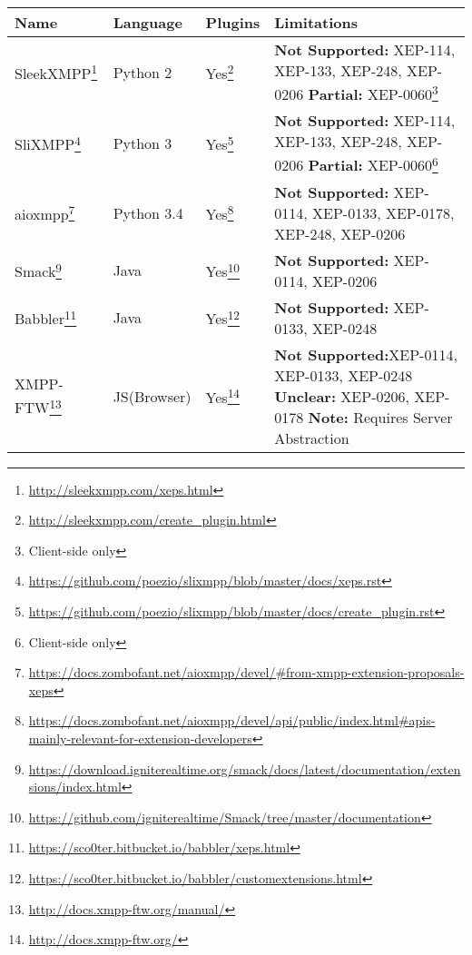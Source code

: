 \begin{tabu}{l|l l X}
    \hline
    Name
    & Language
    & Plugins
    & Limitations
    \\ \hline

    SleekXMPP\footnote{\url{http://sleekxmpp.com/xeps.html}}
    & Python 2
    & Yes\footnote{\url{http://sleekxmpp.com/create_plugin.html}}
    & \textbf{Not Supported:} XEP-114, XEP-133, XEP-248, XEP-0206\newline
    \textbf{Partial:} XEP-0060\footnote{Client-side only}
    \\

    SliXMPP\footnote{\url{https://github.com/poezio/slixmpp/blob/master/docs/xeps.rst}}
    & Python 3
    & Yes\footnote{\url{https://github.com/poezio/slixmpp/blob/master/docs/create_plugin.rst}}
    & \textbf{Not Supported:} XEP-114, XEP-133, XEP-248, XEP-0206\newline
    \textbf{Partial:} XEP-0060\footnote{Client-side only}
    \\

    aioxmpp\footnote{\url{https://docs.zombofant.net/aioxmpp/devel/\#from-xmpp-extension-proposals-xeps}}
    & Python 3.4
    & Yes\footnote{\url{https://docs.zombofant.net/aioxmpp/devel/api/public/index.html\#apis-mainly-relevant-for-extension-developers}}
    & \textbf{Not Supported:} XEP-0114, XEP-0133, XEP-0178, XEP-248, XEP-0206
    \\

    Smack\footnote{\url{https://download.igniterealtime.org/smack/docs/latest/documentation/extensions/index.html}}
    & Java
    & Yes\footnote{\url{https://github.com/igniterealtime/Smack/tree/master/documentation}}
    & \textbf{Not Supported:} XEP-0114, XEP-0206
    \\

    Babbler\footnote{\url{https://sco0ter.bitbucket.io/babbler/xeps.html}}
    & Java
    & Yes\footnote{\url{https://sco0ter.bitbucket.io/babbler/customextensions.html}}
    & \textbf{Not Supported:} XEP-0133, XEP-0248
    \\

    XMPP-FTW\footnote{\url{http://docs.xmpp-ftw.org/manual/}}
    & JS(Browser)
    & Yes\footnote{\url{http://docs.xmpp-ftw.org/}}
    & \textbf{Not Supported:}\newline XEP-0114, XEP-0133, XEP-0248\newline
    \textbf{Unclear:} XEP-0206, XEP-0178\newline
    \textbf{Note:} Requires Server Abstraction
    \\


\end{tabu}
